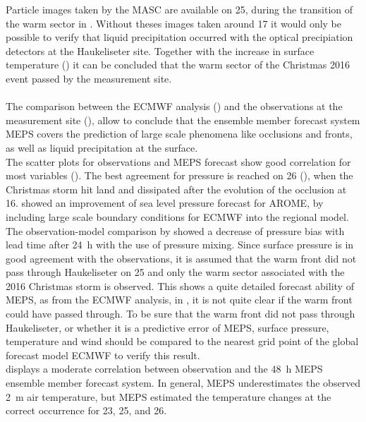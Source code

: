 Particle images taken by the MASC are available on \SI{25}{\dec}, during the transition of the warm sector in . Without theses images taken around \SI{17}{\UTC} it would only be possible to verify that liquid precipitation occurred with the optical precipiation detectors at the Haukeliseter site. Together with the increase in surface temperature () it can be concluded that the warm sector of the Christmas 2016 event passed by the measurement site.
%
\\
\\
The comparison between the ECMWF analysis () and the observations at the measurement site (), allow to conclude that the ensemble member forecast system MEPS covers the prediction of large scale phenomena like occlusions and fronts, as well as liquid precipitation at the surface. 
\\
The scatter plots for observations and MEPS forecast show good correlation for most variables ().
The best agreement for pressure is reached on \SI{26}{\dec} (), when the Christmas storm hit land and dissipated after the evolution of the occlusion at \SI{16}{\UTC}. \citet{dahlgren_comparison_2013} showed an improvement of sea level pressure forecast for AROME, by including large scale boundary conditions for ECMWF into the regional model. The observation-model comparison by \citet{dahlgren_comparison_2013} showed a decrease of pressure bias with lead time after \SI{24}{\hour} with the use of pressure mixing. 
Since surface pressure is in good agreement with the observations, it is assumed that the warm front did not pass through Haukeliseter on \SI{25}{\dec} and only the warm sector associated with the 2016 Christmas storm is observed. This shows a quite detailed forecast ability of MEPS, as from the ECMWF analysis, in , it is not quite clear if the warm front could have passed through. To be sure that the warm front did not pass through Haukeliseter, or whether it is a predictive error of MEPS, surface pressure, temperature and wind should be compared to the nearest grid point of the global forecast model ECMWF to verify this result.
\\
 displays a moderate correlation between observation and the \SI{48}{\hour} MEPS ensemble member forecast system. In general, MEPS underestimates the observed \SI{2}{\metre} air temperature, but MEPS estimated the temperature changes at the correct occurrence for \num{23}, \num{25}, and \SI{26}{\dec}. 
